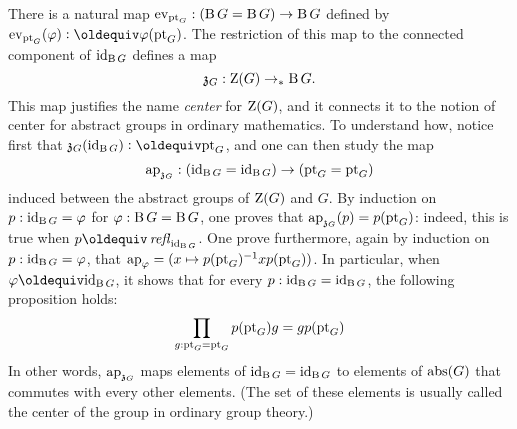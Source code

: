There is a natural map $\mathrm{ev}_{\mathrm{pt}_G} : ({\operatorname{B} G}={\operatorname{B} G}) \to {\operatorname{B}G}$
defined by $\ev_{\pt_G}(\varphi)\defequi \varphi(\pt_G)$. The
restriction of this map to the connected component of $\mathord{\mathrm{id}}_{\operatorname{B} G}$
defines a map
\begin{displaymath}
  \mathfrak z_{{G}} : \operatorname{Z}(G) \to_\ast {\operatorname{B}G}.
\end{displaymath}
This map justifies the name {\em center} for $\operatorname{Z}(G)$, and it
connects it to the notion of center for abstract groups in ordinary
mathematics. To understand how, notice first that
$\grpcenterinc G (\id_{\clf G}) \defequi \pt_G$, and one can then study the
map
\begin{displaymath}
  \mathop{\mathrm{ap}_{\mathfrak z_{{G}}}}: (\mathord{\mathrm{id}}_{\operatorname{B} G}=\mathord{\mathrm{id}}_{\operatorname{B} G}) \to (\mathrm{pt}_G = \mathrm{pt}_G)
\end{displaymath}
induced between the abstract groups of $\operatorname{Z}(G)$ and $G$. By
induction on $p:\mathord{\mathrm{id}}_{\operatorname{B} G} = \varphi$ for $\varphi:{\operatorname{B} G}={\operatorname{B} G}$, one proves
that $\mathop{\mathrm{ap}_{\mathfrak z_{{G}}}}(p) = p(\mathrm{pt}_G)$: indeed, this is true when
$p\jdeq \refl {\id_{\clf G}}$. One prove furthermore, again by induction
on $p:\mathord{\mathrm{id}}_{\operatorname{B} G} = \varphi$, that
$\mathop{\mathrm{ap}_{\varphi}} = (x\mapsto p(\mathrm{pt}_G)^{-1} x p(\mathrm{pt}_G))$. In particular,
when $\varphi \jdeq \id_{\clf G}$, it shows that for every
$p:\mathord{\mathrm{id}}_{\operatorname{B} G}=\mathord{\mathrm{id}}_{\operatorname{B} G}$, the following proposition holds:
\begin{displaymath}
  \prod_{g:\mathrm{pt}_G=\mathrm{pt}_G }p(\mathrm{pt}_G) g = g p(\mathrm{pt}_G)
\end{displaymath}
In other words, $\mathop{\mathrm{ap}_{\mathfrak z_{{G}}}}$ maps elements of
$\mathord{\mathrm{id}}_{\operatorname{B} G}=\mathord{\mathrm{id}}_{\operatorname{B} G}$ to elements of $\mathrm{abs}(G)$ that commutes with
every other elements. (The set of these elements is usually called the
center of the group in ordinary group theory.)

